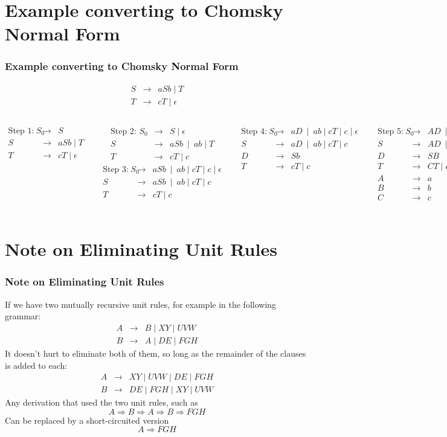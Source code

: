 \documentclass{beamer}
\newcommand{\arr}{&\rightarrow&}
\newcommand{\bee}{\begin{eqnarray*}}
\newcommand{\eee}{\end{eqnarray*}}
\newcommand{\emptystring}{\ensuremath{\epsilon}}
\newcommand{\sect}[1]{
\section{#1}
\begin{frame}[fragile]\frametitle{#1}
}
\begin{document}
\sect{Example converting to Chomsky Normal Form}
\footnotesize
\bee
S \arr aSb \mid T\\
T \arr cT \mid \emptystring
\eee
\vspace{-1cm}
\begin{columns}
\bee
\mbox{Step 1:\ \ }
S_0 \arr S\\
S \arr aSb \mid T\\
T \arr cT \mid \emptystring
\eee

\bee
\mbox{Step 2:\ \ }
S_0 \arr S \mid \emptystring\\
S \arr aSb \ \mid\  ab \mid T\\
T \arr cT \mid c
\eee
\bee
\mbox{Step 3:\ \ }
S_0 \arr aSb \ \mid\  ab \mid cT \mid c \mid \emptystring\\
S \arr aSb \ \mid\  ab \mid cT \mid c\\
T \arr cT \mid c\\
\eee


\bee
\mbox{Step 4:\ \ }
S_0 \arr aD \ \mid\  ab \mid cT \mid c \mid \emptystring\\
S \arr aD\ \mid\  ab \mid cT \mid c\\
D \arr Sb\\
T \arr cT \mid c
\eee


\bee
\mbox{Step 5:\ \ }
S_0 \arr AD \ \mid\  AB \mid CT \mid c \mid \emptystring\\
S \arr AD \ \mid\  AB \mid CT \mid c\\
D \arr SB\\
T \arr CT \mid c\\
A\arr a\\
B\arr b\\
C\arr c
\eee


\vfill
\end{columns}


\end{frame}

\sect{Note on Eliminating Unit Rules}
If we have two mutually recursive unit rules, for example in the
following grammar: 
\begin{eqnarray*}
A &\rightarrow& B \mid XY \mid UVW\\
B &\rightarrow& A \mid DE \mid FGH
\end{eqnarray*}
It doesn't hurt to eliminate both of them, so long as the remainder of
the clauses is added to each:
\begin{eqnarray*}
A &\rightarrow&  XY \mid UVW \mid DE \mid FGH\\
B &\rightarrow&  DE \mid FGH \mid XY \mid UVW
\end{eqnarray*}
Any derivation that used the two unit rules, such as
\[
A \Rightarrow B \Rightarrow A \Rightarrow B \Rightarrow FGH
\]
Can be replaced by a short-circuited version
\[
A \Rightarrow FGH
\]
\end{frame}
\end{document}
